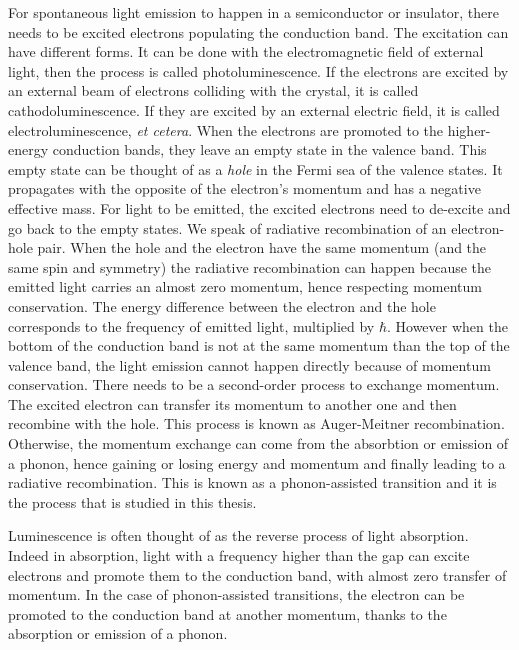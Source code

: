 For spontaneous light emission to happen in a semiconductor or insulator, there needs to be excited electrons populating the conduction band. The excitation can have different forms. It can be done with the electromagnetic field of external light, then the process is called photoluminescence. If the electrons are excited by an external beam of electrons colliding with the crystal, it is called cathodoluminescence. If they are excited by an external electric field, it is called electroluminescence, \textit{et cetera}. When the electrons are promoted to the higher-energy conduction bands, they leave an empty state in the valence band. This empty state can be thought of as a \textit{hole} in the Fermi sea of the valence states. It propagates with the opposite of the electron's momentum and has a negative effective mass. For light to be emitted, the excited electrons need to de-excite and go back to the empty states. We speak of radiative recombination of an electron-hole pair. When the hole and the electron have the same momentum (and the same spin and symmetry) the radiative recombination can happen because the emitted light carries an almost zero momentum, hence respecting momentum conservation. The energy difference between the electron and the hole corresponds to the frequency of emitted light, multiplied by $\hbar$. 
However when the bottom of the conduction band is not at the same momentum than the top of the valence band, the light emission cannot happen directly because of momentum conservation. There needs to be a second-order process to exchange momentum. The excited electron can transfer its momentum to another one and then recombine with the hole. This process is known as Auger-Meitner recombination.\cite{delaney2009auger} Otherwise, the momentum exchange can come from the absorbtion or emission of a phonon, hence gaining or losing energy and momentum and finally leading to a radiative recombination. This is known as a phonon-assisted transition and it is the process that is studied in this thesis. 

Luminescence is often thought of as the reverse process of light absorption. Indeed in absorption, light with a frequency higher than the gap can excite electrons and promote them to the conduction band, with almost zero transfer of momentum. In the case of phonon-assisted transitions, the electron can be promoted to the conduction band at another momentum, thanks to the absorption or emission of a phonon. 

